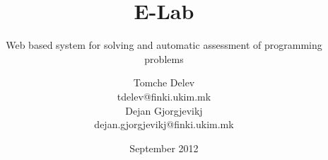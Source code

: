 

\author[T. Delev \and D. Gjorgjevikj]{Tomche Delev\\tdelev@finki.ukim.mk\\ Dejan
Gjorgjevikj\\dejan.gjorgjevikj@finki.ukim.mk}
\title[E-Lab]{E-Lab}
\subtitle{Web based system for solving and automatic assessment of
programming problems}
\date{September 2012}




\frame[t,plain]{\titlepage}





